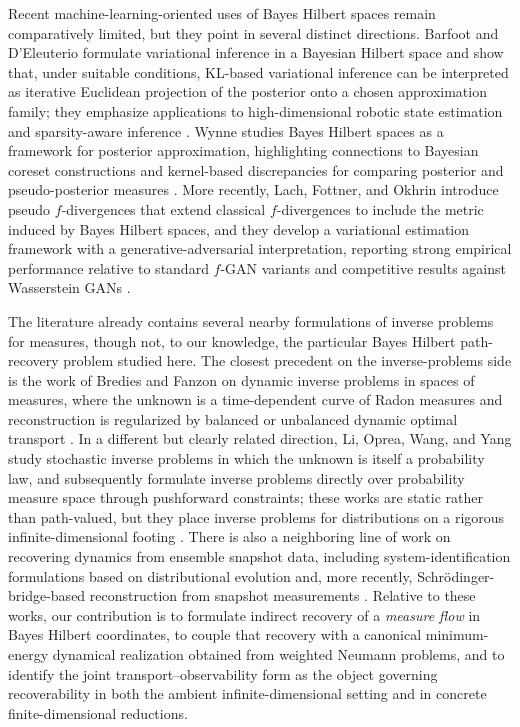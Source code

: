 \documentclass{article}
\theoremstyle{definition}
\begin{document}
Recent machine-learning-oriented uses of Bayes Hilbert spaces remain comparatively limited, but they point in several distinct directions. Barfoot and D'Eleuterio formulate variational inference in a Bayesian Hilbert space and show that, under suitable conditions, KL-based variational inference can be interpreted as iterative Euclidean projection of the posterior onto a chosen approximation family; they emphasize applications to high-dimensional robotic state estimation and sparsity-aware inference \citep{barfootVariationalInferenceIterative2023}. Wynne studies Bayes Hilbert spaces as a framework for posterior approximation, highlighting connections to Bayesian coreset constructions and kernel-based discrepancies for comparing posterior and pseudo-posterior measures \citep{wynneBayesHilbertSpaces2023}. More recently, Lach, Fottner, and Okhrin introduce pseudo \(f\)-divergences that extend classical \(f\)-divergences to include the metric induced by Bayes Hilbert spaces, and they develop a variational estimation framework with a generative-adversarial interpretation, reporting strong empirical performance relative to standard \(f\)-GAN variants and competitive results against Wasserstein GANs \citep{lachBridgingGapFdivergences2025}.

The literature already contains several nearby formulations of inverse problems for measures, though not, to our knowledge, the particular Bayes Hilbert path-recovery problem studied here. The closest precedent on the inverse-problems side is the work of Bredies and Fanzon on dynamic inverse problems in spaces of measures, where the unknown is a time-dependent curve of Radon measures and reconstruction is regularized by balanced or unbalanced dynamic optimal transport \citep{bredies2020dynamic}. In a different but clearly related direction, Li, Oprea, Wang, and Yang study stochastic inverse problems in which the unknown is itself a probability law, and subsequently formulate inverse problems directly over probability measure space through pushforward constraints; these works are static rather than path-valued, but they place inverse problems for distributions on a rigorous infinite-dimensional footing \citep{li2024stochastic,li2025measure}. There is also a neighboring line of work on recovering dynamics from ensemble snapshot data, including system-identification formulations based on distributional evolution and, more recently, Schr\"odinger-bridge-based reconstruction from snapshot measurements \citep{aalto2019snapshot,morimoto2025linear}.
Relative to these works, our contribution is to formulate indirect recovery of a \emph{measure flow} in Bayes Hilbert coordinates, to couple that recovery with a canonical minimum-energy dynamical realization obtained from weighted Neumann problems, and to identify the joint transport--observability form as the object governing recoverability in both the ambient infinite-dimensional setting and in concrete finite-dimensional reductions.
\end{document}

